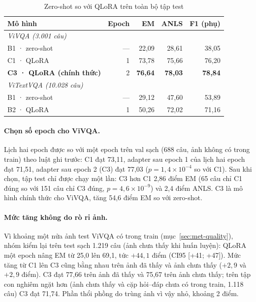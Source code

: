 \begin{table}[htbp]
\caption{Zero-shot so với QLoRA trên toàn bộ tập test}
\label{tab:res-qlora}
\centering
\small
\begin{tabular}{p{}rrrr}
\toprule
\textbf{Mô hình} & \textbf{Epoch} & \textbf{EM} & \textbf{ANLS} & \textbf{F1 (phụ)} \\
\midrule
\multicolumn{5}{l}{\textit{ViVQA (3.001 câu)}} \\
B1 · zero-shot & --- & 22,09 & 28,61 & 38,05 \\
C1 · QLoRA & 1 & 73,78 & 75,66 & 76,20 \\
\textbf{C3 · QLoRA (chính thức)} & 2 & \textbf{76,64} & \textbf{78,03} & \textbf{78,84} \\
\midrule
\multicolumn{5}{l}{\textit{ViTextVQA (10.028 câu)}} \\
B1 · zero-shot & --- & 29,12 & 47,60 & 53,89 \\
B2 · QLoRA & 1 & 50,26 & 72,02 & 71,16 \\
\bottomrule
\end{tabular}
\end{table}

\paragraph{Chọn số epoch cho ViVQA.} Lịch hai epoch được so với một epoch trên val
sạch (688 câu, ảnh không có trong train) theo luật ghi trước: C1 đạt 73,11, adapter
sau epoch 1 của lịch hai epoch đạt 71,51, adapter sau epoch 2 (C3) đạt 77,03
($p = 1{,}4\times10^{-4}$ so với C1). Sau khi chọn, tập test chỉ được chạy một lần:
C3 hơn C1 2,86 điểm EM (65 câu chỉ C1 đúng so với 151 câu chỉ C3 đúng,
$p = 4{,}6\times10^{-9}$) và 2,4 điểm ANLS. C3 là mô hình chính thức cho ViVQA,
tăng 54,6 điểm EM so với zero-shot.

\paragraph{Mức tăng không do rò rỉ ảnh.} Vì khoảng một nửa ảnh test ViVQA có trong
train (mục~\ref{sec:met-quality}), nhóm kiểm lại trên test sạch 1.219 câu (ảnh
chưa thấy khi huấn luyện): QLoRA một epoch nâng EM từ 25,0 lên 69,1, tức
$+44{,}1$ điểm (CI95 [+41; +47]). Mức tăng từ C1 lên C3 cũng bằng nhau trên ảnh đã
thấy và ảnh chưa thấy ($+2{,}9$ và $+2{,}9$ điểm). C3 đạt 77,66 trên ảnh đã thấy
và 75,67 trên ảnh chưa thấy; trên tập con nghiêm ngặt hơn (ảnh chưa thấy và cặp
hỏi--đáp chưa có trong train, 1.118 câu) C3 đạt 71,74. Phần thổi phồng do trùng
ảnh vì vậy nhỏ, khoảng 2 điểm.

